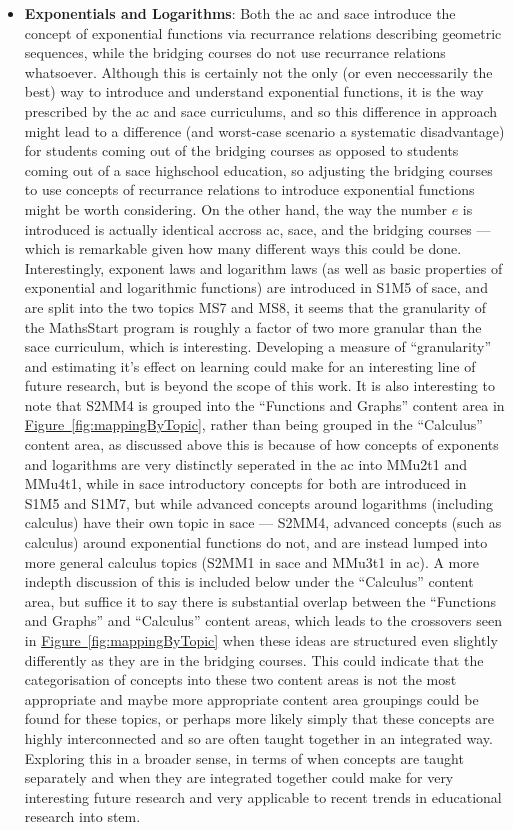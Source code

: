 \documentclass[twoside,12pt,a4paper]{report}
\newcommand{\reffig}[1]{\hyperref[fig:#1]{Figure~\ref{fig:#1}}}
\begin{document}
\begin{itemize}
	\item \textbf{Exponentials and Logarithms}: Both the \gls{ac} and \gls{sace} introduce the concept of exponential functions via recurrance relations describing geometric sequences, while the bridging courses do not use recurrance relations whatsoever. Although this is certainly not the only (or even neccessarily the best) way to introduce and understand exponential functions, it is the way prescribed by the \gls{ac} and \gls{sace} curriculums, and so this difference in approach might lead to a difference (and worst-case scenario a systematic disadvantage) for students coming out of the bridging courses as opposed to students coming out of a \gls{sace} highschool education, so adjusting the bridging courses to use concepts of recurrance relations to introduce exponential functions might be worth considering. On the other hand, the way the number $e$ is introduced is actually identical accross \gls{ac}, \gls{sace}, and the bridging courses --- which is remarkable given how many different ways this could be done. Interestingly, exponent laws and logarithm laws (as well as basic properties of exponential and logarithmic functions) are introduced in S1M5 of \gls{sace}, and are split into the two topics MS7 and MS8, it seems that the granularity of the MathsStart program is roughly a factor of two more granular than the \gls{sace} curriculum, which is interesting. Developing a measure of ``granularity'' and estimating it's effect on learning could make for an interesting line of future research, but is beyond the scope of this work. It is also interesting to note that S2MM4 is grouped into the ``Functions and Graphs'' content area in \reffig{mappingByTopic}, rather than being grouped in the ``Calculus'' content area, as discussed above this is because of how concepts of exponents and logarithms are very distinctly seperated in the \gls{ac} into MMu2t1 and MMu4t1, while in \gls{sace} introductory concepts for both are introduced in S1M5 and S1M7, but while advanced concepts around logarithms (including calculus) have their own topic in \gls{sace} --- S2MM4, advanced concepts (such as calculus) around exponential functions do not, and are instead lumped into more general calculus topics (S2MM1 in \gls{sace} and MMu3t1 in \gls{ac}). A more indepth discussion of this is included below under the ``Calculus'' content area, but suffice it to say there is substantial overlap between the ``Functions and Graphs'' and ``Calculus'' content areas, which leads to the crossovers seen in \reffig{mappingByTopic} when these ideas are structured even slightly differently as they are in the bridging courses. This could indicate that the categorisation of concepts into these two content areas is not the most appropriate and maybe more appropriate content area groupings could be found for these topics, or perhaps more likely simply that these concepts are highly interconnected and so are often taught together in an integrated way. Exploring this in a broader sense, in terms of when concepts are taught separately and when they are integrated together could make for very interesting future research and very applicable to recent trends in educational research into \gls{stem}.

\end{itemize}
\end{document}
